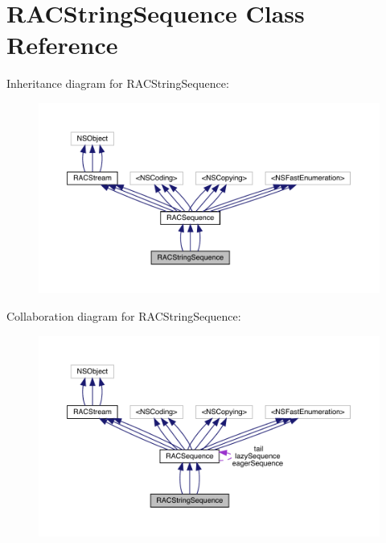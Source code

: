 \hypertarget{interface_r_a_c_string_sequence}{}\section{R\+A\+C\+String\+Sequence Class Reference}
\label{interface_r_a_c_string_sequence}


Inheritance diagram for R\+A\+C\+String\+Sequence\+:\nopagebreak
\begin{figure}[H]
\begin{center}
\leavevmode
\includegraphics[width=350pt]{interface_r_a_c_string_sequence__inherit__graph}
\end{center}
\end{figure}


Collaboration diagram for R\+A\+C\+String\+Sequence\+:\nopagebreak
\begin{figure}[H]
\begin{center}
\leavevmode
\includegraphics[width=350pt]{interface_r_a_c_string_sequence__coll__graph}
\end{center}
\end{figure}

